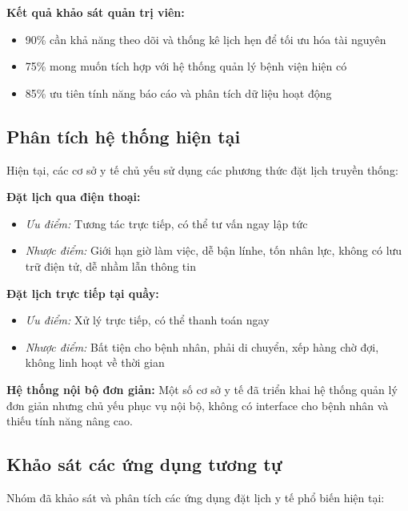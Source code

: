 \documentclass[../DoAn.tex]{subfiles}
\begin{document}
\textbf{Kết quả khảo sát quản trị viên:}
\begin{itemize}
    \item 90\% cần khả năng theo dõi và thống kê lịch hẹn để tối ưu hóa tài nguyên
    \item 75\% mong muốn tích hợp với hệ thống quản lý bệnh viện hiện có
    \item 85\% ưu tiên tính năng báo cáo và phân tích dữ liệu hoạt động
\end{itemize}

\subsection{Phân tích hệ thống hiện tại}

Hiện tại, các cơ sở y tế chủ yếu sử dụng các phương thức đặt lịch truyền thống:

\textbf{Đặt lịch qua điện thoại:}
\begin{itemize}
    \item \textit{Ưu điểm:} Tương tác trực tiếp, có thể tư vấn ngay lập tức
    \item \textit{Nhược điểm:} Giới hạn giờ làm việc, dễ bận línhe, tốn nhân lực, không có lưu trữ điện tử, dễ nhầm lẫn thông tin
\end{itemize}

\textbf{Đặt lịch trực tiếp tại quầy:}
\begin{itemize}
    \item \textit{Ưu điểm:} Xử lý trực tiếp, có thể thanh toán ngay
    \item \textit{Nhược điểm:} Bất tiện cho bệnh nhân, phải di chuyển, xếp hàng chờ đợi, không linh hoạt về thời gian
\end{itemize}

\textbf{Hệ thống nội bộ đơn giản:}
Một số cơ sở y tế đã triển khai hệ thống quản lý đơn giản nhưng chủ yếu phục vụ nội bộ, không có interface cho bệnh nhân và thiếu tính năng nâng cao.

\subsection{Khảo sát các ứng dụng tương tự}

Nhóm đã khảo sát và phân tích các ứng dụng đặt lịch y tế phổ biến hiện tại:
\end{document}

